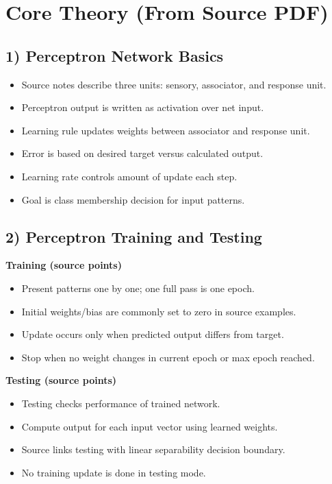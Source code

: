 \documentclass[11pt,a4paper]{article}
\begin{document}
\section*{Core Theory (From Source PDF)}

\subsection*{1) Perceptron Network Basics}
\begin{itemize}
\item Source notes describe three units: sensory, associator, and response unit.
\item Perceptron output is written as activation over net input.
\item Learning rule updates weights between associator and response unit.
\item Error is based on desired target versus calculated output.
\item Learning rate controls amount of update each step.
\item Goal is class membership decision for input patterns.
\end{itemize}

\subsection*{2) Perceptron Training and Testing}
\textbf{Training (source points)}
\begin{itemize}
\item Present patterns one by one; one full pass is one epoch.
\item Initial weights/bias are commonly set to zero in source examples.
\item Update occurs only when predicted output differs from target.
\item Stop when no weight changes in current epoch or max epoch reached.
\end{itemize}

\textbf{Testing (source points)}
\begin{itemize}
\item Testing checks performance of trained network.
\item Compute output for each input vector using learned weights.
\item Source links testing with linear separability decision boundary.
\item No training update is done in testing mode.
\end{itemize}
\end{document}
